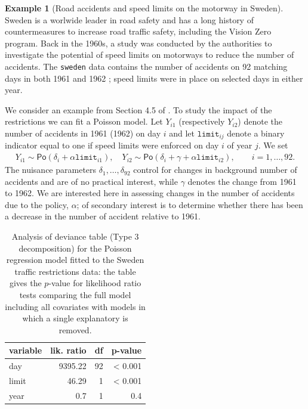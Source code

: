 \documentclass[
  11pt,
  letterpaper,
]{book}
\theoremstyle{definition}
\theoremstyle{definition}
\newtheorem{example}{Example}[chapter]
\theoremstyle{definition}
\theoremstyle{definition}
\theoremstyle{remark}
\begin{document}
\begin{example}[Road accidents and speed limits on the motorway in Sweden]
\protect\hypertarget{exm:roadsweden}{}\label{exm:roadsweden}Sweden is a worlwide leader in road safety and has a long history of countermeasures to increase road traffic safety, including the Vision Zero program. Back in the 1960s, a study was conducted by the authorities to investigate the potential of speed limits on motorways to reduce the number of accidents. The \texttt{sweden} data contains the number of accidents on 92 matching days in both 1961 and 1962 \citep{Svensson:1981}; speed limits were in place on selected days in either year.
\end{example}

We consider an example from Section 4.5 of \citet{Brazzale/Davison/Reid:2007}.
To study the impact of the restrictions we can fit a Poisson model. Let
\(Y_{i1}\) (respectively \(Y_{i2}\)) denote the number of accidents in 1961
(1962) on day \(i\) and let \(\texttt{limit}_{ij}\) denote a binary
indicator equal to one if speed limits were enforced on day \(i\) of year
\(j\). We set
\begin{align*}
Y_{i1} \sim \mathsf{Po}(\delta_i + \alpha \texttt{limit}_{i1}), \quad Y_{i2} \sim\mathsf{Po}(\delta_i + \gamma +  \alpha \texttt{limit}_{i2}), \qquad i=1, \ldots, 92. 
\end{align*}
The nuisance parameters \(\delta_1, \ldots, \delta_{92}\) control for changes in background number of accidents and are of no practical interest, while \(\gamma\) denotes the change from 1961 to 1962. We are interested here in assessing changes in the number of accidents due to the policy, \(\alpha\); of secondary interest is to determine whether there has been a decrease in the number of accident relative to 1961.

\begin{table}

\caption{\label{tab:swedenglm}Analysis of deviance table (Type 3 decomposition) for the Poisson regression model fitted to the Sweden traffic restrictions data: the table gives the $p$-value for likelihood ratio tests comparing the full model including all covariates with models in which a single explanatory is removed.}
\centering
\begin{tabular}[t]{lrrr}
\toprule
variable & lik. ratio & df & p-value\\
\midrule
day & 9395.22 & 92 & < 0.001\\
limit & 46.29 & 1 & < 0.001\\
year & 0.7 & 1 & 0.4\\
\bottomrule
\end{tabular}
\end{table}
\end{document}
